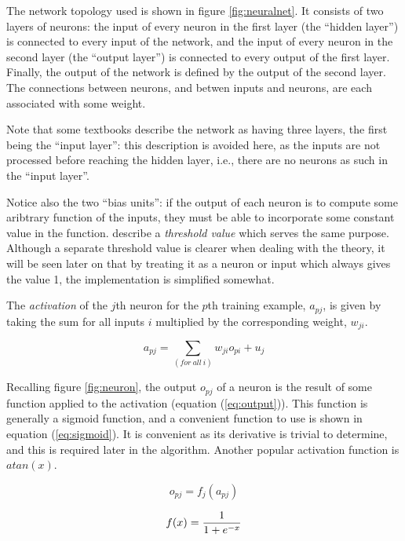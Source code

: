 The network topology used is shown in figure \ref{fig:neuralnet}.  It consists of two layers of neurons: the input of every neuron in the first layer (the ``hidden layer'') is connected to every input of the network, and the input of every neuron in the second layer (the ``output layer'') is connected to every output of the first layer.  Finally, the output of the network is defined by the output of the second layer.  The connections between neurons, and betwen inputs and neurons, are each associated with some weight.

Note that some textbooks describe the network as having three layers, the first being the ``input layer'': this description is avoided here, as the inputs are not processed before reaching the hidden layer, i.e., there are no neurons as such in the ``input layer''.

Notice also the two ``bias units'': if the output of each neuron is to compute some aribtrary function of the inputs, they must be able to incorporate some constant value in the function.   \citet{Aleksander1995} describe a \emph{threshold value} which serves the same purpose.  Although a separate threshold value is clearer when dealing with the theory, it will be seen later on that by treating it as a neuron or input which always gives the value 1, the implementation is simplified somewhat.

The \emph{activation} of the $j$th neuron for the $p$th training example, $a_{pj}$, is given by taking the sum for all inputs $i$ multiplied by the corresponding weight, $w_{ji}$.

\begin{equation}
a_{pj} = \sum_{(for~all~i)} w_{ji}o_{pi} + u_j
\label{eq:activation}
\end{equation}

Recalling figure \ref{fig:neuron}, the output $o_{pj}$ of a neuron is the result of some function applied to the activation (equation (\ref{eq:output})).  This function is generally a sigmoid function, and a convenient function to use is shown in equation (\ref{eq:sigmoid}).  It is convenient as its derivative is trivial to determine, and this is required later in the algorithm.  Another popular activation function is $atan(x)$.

\begin{equation}
o_{pj} = f_j(a_{pj})
\label{eq:output}
\end{equation}

\begin{equation}
f(x) = {1 \over 1 + e^{-x}}
\label{eq:sigmoid}
\end{equation}

